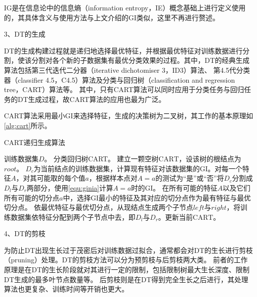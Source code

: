 IG是在信息论中的信息熵（information entropy，IE）概念基础上进行定义使用的，其具体含义与使用方法与上文介绍的GI类似，这里不再进行赘述\cite{Zhou2016,Li2017}。

3、DT的生成

DT的生成构建过程就是递归地选择最优特征，并根据最优特征对训练数据进行分割，使该分割对各个新的子数据集有最优分类效果的过程。其中，DT的经典生成算法包括第三代迭代二分器（iterative dichotomiser 3，ID3）算法、
第4.5代分类器（classifier 4.5，C4.5）算法及分类与回归树（classification and regression tree，CART）算法等\cite{quinlan1986,quinlan1993,breiman1984}。
其中，只有CART算法可以同时应用于分类任务与回归任务的DT生成过程，故CART算法的应用也最为广泛。

CART算法采用最小GI来选择特征，生成的决策树为二叉树，其工作的基本原理如\autoref{alg:cart}所示。
\begin{breakablealgorithm}
    \caption[CART生成算法]{CART递归生成算法\cite{Li2017}}
    \label{alg:cart}
    \begin{algorithmic}[1] %
        \Require 训练数据集$D$。
        \Ensure 分类回归树CART。
        \State 建立一颗空树$\text{CART}$，设该树的根结点为$root$。
                \State $D_c$为当前结点的训练数据集，计算现有特征对该数据集的GI。对每一个特征$A$，对其可能取的每个值$a$，根据样本点对$A=a$的测试为“是”或“否”将$D_c$分割成$D_l$与$D_r$两部分，使用\autoref{equ:ginia}计算$A=a$时的GI。
                \State 在所有可能的特征$A$以及它们所有可能的切分点$a$中，选择GI最小的特征及其对应的切分点作为最有特征与最优切分点。
                \State 依最优特征与最优切分点，从现结点生成两个子节点$left$与$right$，将训练数据集依特征分配到两个子节点中去，即$D_l$与$D_r$。更新当前$\text{CART}$。
                \State {}
                \Else    
                \State {}
                \State {}
                \EndIf
        \EndFunction
    \end{algorithmic}
\end{breakablealgorithm}

4、DT的剪枝

为防止DT出现生长过于茂密后对训练数据过拟合，通常都会对DT的生长进行剪枝（pruning）处理。DT的剪枝方法可以分为预剪枝与后剪枝两大类。
前者的工作原理是在DT的生长阶段就对其进行一定的限制，包括限制树最大生长深度、限制DT生成的最多叶节点数量等。
后剪枝则是在DT得到完全生长之后进行，其处理算法也更复杂、训练时间等开销也更大\cite{Zhou2016,Liu2018}。

